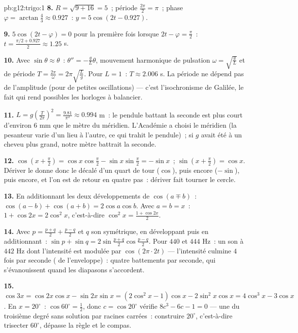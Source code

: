 \begin{solution}{pb:g12:trigo:1}
\textbf{8.} $R = \sqrt{9 + 16} = 5$~; période
$\frac{2\pi}{2} = \pi$~; phase
$\varphi = \arctan\frac43 \approx 0.927$~:
$y = 5\cos(2t - 0.927)$.

\textbf{9.} $5\cos(2t - \varphi) = 0$ pour la première fois lorsque
$2t - \varphi = \frac\pi2$~:
$t = \frac{\pi/2 + 0.927}{2} \approx 1.25$ s.

\textbf{10.} Avec $\sin\theta \approx \theta$~:
$\theta'' = -\frac gL \theta$, mouvement harmonique de pulsation
$\omega = \sqrt{\frac gL}$ et de période
$T = \frac{2\pi}{\omega} = 2\pi\sqrt{\frac Lg}$. Pour $L = 1$~:
$T \approx 2.006$ s. La période ne dépend pas de l'amplitude (pour
de petites oscillations) --- c'est l'isochronisme de Galilée, le
fait qui rend possibles les horloges à balancier.

\textbf{11.} $L = g\left(\frac{T}{2\pi}\right)^2 =
\frac{9.81}{\pi^2} \approx 0.994$ m~: le pendule battant la seconde
est plus court d'environ $6$ mm que le mètre du méridien.
L'Académie a choisi le méridien (la pesanteur varie d'un lieu à
l'autre, ce qui trahit le pendule)~; si $g$ avait été à un cheveu
plus grand, notre mètre battrait la seconde.

\textbf{12.} $\cos\left(x + \frac\pi2\right) =
\cos x \cos\frac\pi2 - \sin x \sin\frac\pi2 = -\sin x$~;
$\sin\left(x + \frac\pi2\right) = \cos x$. Dériver le  donne
donc le  décalé d'un quart de tour ($\cos$), puis encore
($-\sin$), puis encore, et l'on est de retour en quatre pas~:
dériver fait tourner le cercle.

\textbf{13.} En additionnant les deux développements de
$\cos(a \mp b)$~: $\cos(a-b) + \cos(a+b) = 2\cos a\cos b$. Avec
$a = b = x$~: $1 + \cos 2x = 2\cos^2 x$, c'est-à-dire
$\cos^2 x = \frac{1 + \cos 2x}{2}$.

\textbf{14.} Avec $p = \frac{p+q}{2} + \frac{p-q}{2}$ et $q$ son
symétrique, en développant puis en additionnant~:
$\sin p + \sin q = 2\sin\frac{p+q}{2}\cos\frac{p-q}{2}$. Pour
$440$ et $444$ Hz~: un son à $442$ Hz dont l'intensité est modulée
par $\cos(2\pi \cdot 2t)$ --- l'intensité culmine $4$ fois par
seconde ( de l'enveloppe)~: quatre battements par
seconde, qui s'évanouissent quand les diapasons s'accordent.

\textbf{15.} $\cos 3x = \cos 2x\cos x - \sin 2x \sin x =
(2\cos^2 x - 1)\cos x - 2\sin^2 x\cos x = 4\cos^3 x - 3\cos x$. En
$x = 20^\circ$~: $\cos 60^\circ = \frac12$, donc
$c = \cos 20^\circ$ vérifie $8c^3 - 6c - 1 = 0$ --- une  du
troisième degré sans solution par racines carrées~: construire
$20^\circ$, c'est-à-dire trisecter $60^\circ$, dépasse la règle et
le compas.


\end{solution}
